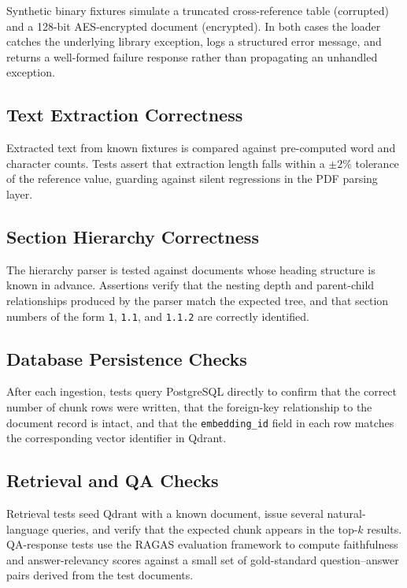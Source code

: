 \documentclass[12pt,a4paper]{report}
\begin{document}
Synthetic binary fixtures simulate a truncated cross-reference table (corrupted)
and a 128-bit AES-encrypted document (encrypted). In both cases the loader
catches the underlying library exception, logs a structured error message, and
returns a well-formed failure response rather than propagating an unhandled
exception.

\subsection{Text Extraction Correctness}

Extracted text from known fixtures is compared against pre-computed word and
character counts. Tests assert that extraction length falls within a $\pm 2\%$
tolerance of the reference value, guarding against silent regressions in the PDF
parsing layer.

\subsection{Section Hierarchy Correctness}

The hierarchy parser is tested against documents whose heading structure is known
in advance. Assertions verify that the nesting depth and parent-child
relationships produced by the parser match the expected tree, and that section
numbers of the form \texttt{1}, \texttt{1.1}, and \texttt{1.1.2} are correctly
identified.

\subsection{Database Persistence Checks}

After each ingestion, tests query PostgreSQL directly to confirm that the correct
number of chunk rows were written, that the foreign-key relationship to the
document record is intact, and that the \texttt{embedding\_id} field in each row
matches the corresponding vector identifier in Qdrant.

\subsection{Retrieval and QA Checks}

Retrieval tests seed Qdrant with a known document, issue several
natural-language queries, and verify that the expected chunk appears in the
top-$k$ results. QA-response tests use the RAGAS evaluation framework to
compute faithfulness and answer-relevancy scores against a small set of
gold-standard question--answer pairs derived from the test documents.
\end{document}
